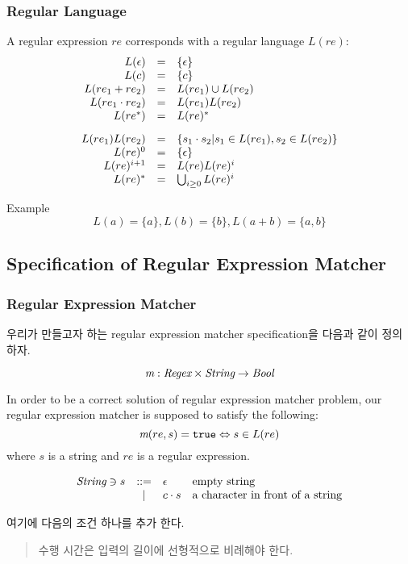 \begin{frame}

\frametitle{Regular Language}

A regular expression $re$ corresponds with a regular language
$L(re)$:
\[
\begin{array}{rcl}
  L(\e) & = & \{\e\} \\
  L(c) & = & \{c\} \\
  L(\replus) & = & L(\rone) \cup L(\rtwo) \\
  L(\retimes) & = & L(\rone)L(\rtwo) \\
  L(\restar) & = & L(re)^{*} \\[3mm]
  L(\rone)L(\rtwo) & = & \{s_{1}\cdot s_{2} | s_{1}\in L(\rone), s_{2}\in L(\rtwo)\} \\
  L(re)^{0} & = & \{\e\} \\
  L(re)^{i+1} & = & L(re)L(re)^{i} \\
  L(re)^{*} & = & \bigcup_{i\ge 0}L(re)^{i}
\end{array}
\]

\begin{block}{Example}
    \[
        L(a) = \{a\}, L(b) = \{b\}, L(a+b) = \{a, b\}
        \]
\end{block}

\end{frame}

\subsection{Specification of Regular Expression Matcher}

\begin{frame}
\frametitle{Regular Expression Matcher}

우리가 만들고자 하는 regular expression matcher  
specification을 다음과 같이 정의하자.

\begin{block}

\[
    \M : \mbit{Regex} \times \mbit{String} \ra \mbit{Bool}
\]

In order to be a correct solution of regular expression matcher problem, 
our regular expression matcher \M{} is supposed to satisfy the following:
 \[
    \rmatch{s}{re} = \T \Lra s \in L(re) 
 \]
where $s$ is a string and $re$ is a regular expression.

\[
\begin{array}{lcll}
    \mbit{String} \ni  s & ::= & \e & \mbox{empty string} \\
    & | & c \cdot s & \mbox{a character in front of a string}
\end{array}
\]
\end{block}


여기에 다음의 조건 하나를 추가 한다.
\begin{quote}
수행 시간은 입력의 길이에 선형적으로 비례해야 한다. 
\end{quote}

\end{frame}
